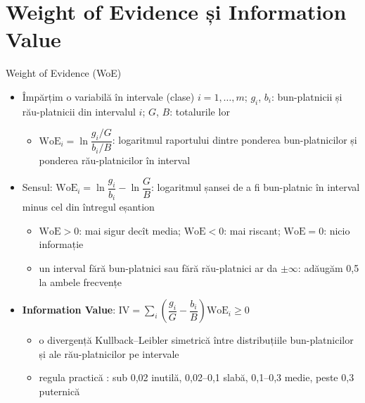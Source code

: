 \section{Weight of Evidence și Information Value}

\begin{frame}{Weight of Evidence (WoE)}
\itemsize{\footnotesize}
\begin{itemize}
    \item Împărțim o variabilă în intervale (clase) $i = 1, \dots, m$; $g_i$, $b_i$: bun-platnicii și rău-platnicii din intervalul $i$; $G$, $B$: totalurile lor
    \begin{itemize}
        \item $\mathrm{WoE}_i = \ln\dfrac{g_i/G}{b_i/B}$: logaritmul raportului dintre ponderea bun-platnicilor și ponderea rău-platnicilor în interval
    \end{itemize}
    \item Sensul: $\mathrm{WoE}_i = \ln\dfrac{g_i}{b_i} - \ln\dfrac{G}{B}$: logaritmul șansei de a fi bun-platnic în interval minus cel din întregul eșantion
    \begin{itemize}
        \item $\mathrm{WoE} > 0$: mai sigur decît media; $\mathrm{WoE} < 0$: mai riscant; $\mathrm{WoE} = 0$: nicio informație
        \item un interval fără bun-platnici sau fără rău-platnici ar da $\pm\infty$: adăugăm 0,5 la ambele frecvențe
    \end{itemize}
    \item \textbf{Information Value}: $\mathrm{IV} = \sum_i \left(\dfrac{g_i}{G} - \dfrac{b_i}{B}\right)\mathrm{WoE}_i \ge 0$
    \begin{itemize}
        \item o divergență Kullback--Leibler simetrică între distribuțiile bun-platnicilor și ale rău-platnicilor pe intervale
        \item regula practică : sub 0,02 inutilă, 0,02--0,1 slabă, 0,1--0,3 medie, peste 0,3 puternică
    \end{itemize}
\end{itemize}
\end{frame}

